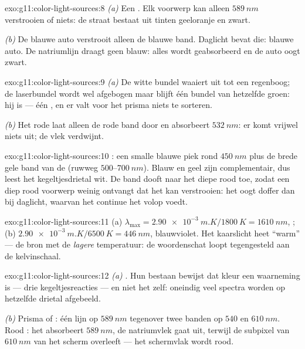 \begin{solution}{exo:g11:color-light-sources:8}
\emph{(a)} Een . Elk voorwerp kan alleen
$\qty{589}{nm}$ verstrooien of niets: de straat bestaat uit tinten
geeloranje en zwart.

\emph{(b)} De blauwe auto verstrooit alleen de blauwe band. Daglicht
bevat die: blauwe auto. De natriumlijn draagt geen blauw: alles wordt
geabsorbeerd en de auto oogt zwart.
\end{solution}

\begin{solution}{exo:g11:color-light-sources:9}
\emph{(a)} De witte bundel waaiert uit tot een regenboog; de laserbundel
wordt wel afgebogen maar blijft één bundel van hetzelfde groen: hij is
 --- één , en er valt voor het prisma niets te
sorteren.

\emph{(b)} Het rode  laat alleen de rode band door en absorbeert
$\qty{532}{nm}$: er komt vrijwel niets uit; de vlek verdwijnt.
\end{solution}

\begin{solution}{exo:g11:color-light-sources:10}
: een smalle blauwe piek rond $\qty{450}{nm}$ plus de brede gele
band van de  (ruwweg $500$--$\qty{700}{nm}$). Blauw en geel zijn
complementair, dus leest het kegeltjesdrietal wit. De band dooft naar het
diepe rood toe, zodat een diep rood voorwerp weinig ontvangt dat het kan
verstrooien: het oogt doffer dan bij daglicht, waarvan het continue
 het volop voedt.
\end{solution}

\begin{solution}{exo:g11:color-light-sources:11}
(a) $\lambda_{\max} = \qty{2.90e-3}{m.K}/\qty{1800}{K} = \qty{1610}{nm}$,
; (b) $\qty{2.90e-3}{m.K}/\qty{6500}{K} = \qty{446}{nm}$,
blauwviolet. Het kaarslicht heet ``warm'' --- de bron met de
\emph{lagere} temperatuur: de woordenschat loopt tegengesteld aan de
kelvinschaal.
\end{solution}

\begin{solution}{exo:g11:color-light-sources:12}
\emph{(a)} . Hun bestaan bewijst dat kleur een waarneming is ---
drie kegeltjesreacties --- en niet het  zelf: oneindig veel
spectra worden op hetzelfde drietal afgebeeld.

\emph{(b)} Prisma of : één lijn op $\qty{589}{nm}$ tegenover
twee banden op $540$ en $\qty{610}{nm}$. Rood : het absorbeert
$\qty{589}{nm}$, de natriumvlek gaat uit, terwijl de subpixel van
$\qty{610}{nm}$ van het scherm overleeft --- het schermvlak wordt rood.
\end{solution}

